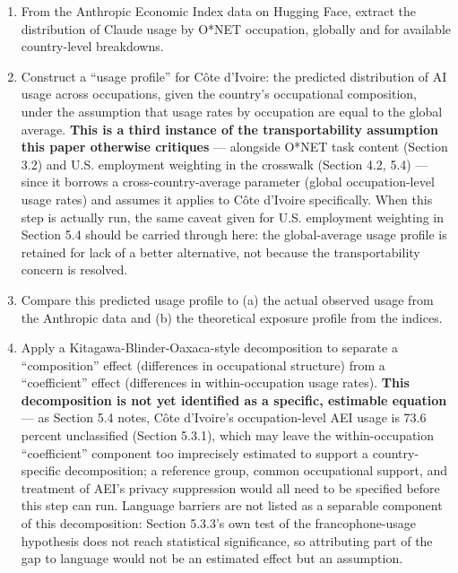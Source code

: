 \documentclass[
  11pt,
]{article}
\providecommand{\tightlist}{%
  \setlength{\itemsep}{0pt}\setlength{\parskip}{0pt}}
\begin{document}
\begin{enumerate}
\def\labelenumi{\arabic{enumi}.}
\tightlist
\item
  From the Anthropic Economic Index data on Hugging Face, extract the
  distribution of Claude usage by O*NET occupation, globally and for
  available country-level breakdowns.
\item
  Construct a ``usage profile'' for Côte d'Ivoire: the predicted
  distribution of AI usage across occupations, given the country's
  occupational composition, under the assumption that usage rates by
  occupation are equal to the global average. \textbf{This is a third
  instance of the transportability assumption this paper otherwise
  critiques} --- alongside O*NET task content (Section 3.2) and U.S.
  employment weighting in the crosswalk (Section 4.2, 5.4) --- since it
  borrows a cross-country-average parameter (global occupation-level
  usage rates) and assumes it applies to Côte d'Ivoire specifically.
  When this step is actually run, the same caveat given for U.S.
  employment weighting in Section 5.4 should be carried through here:
  the global-average usage profile is retained for lack of a better
  alternative, not because the transportability concern is resolved.
\item
  Compare this predicted usage profile to (a) the actual observed usage
  from the Anthropic data and (b) the theoretical exposure profile from
  the indices.
\item
  Apply a Kitagawa-Blinder-Oaxaca-style decomposition to separate a
  ``composition'' effect (differences in occupational structure) from a
  ``coefficient'' effect (differences in within-occupation usage rates).
  \textbf{This decomposition is not yet identified as a specific,
  estimable equation} --- as Section 5.4 notes, Côte d'Ivoire's
  occupation-level AEI usage is 73.6 percent unclassified (Section
  5.3.1), which may leave the within-occupation ``coefficient''
  component too imprecisely estimated to support a country-specific
  decomposition; a reference group, common occupational support, and
  treatment of AEI's privacy suppression would all need to be specified
  before this step can run. Language barriers are not listed as a
  separable component of this decomposition: Section 5.3.3's own test of
  the francophone-usage hypothesis does not reach statistical
  significance, so attributing part of the gap to language would not be
  an estimated effect but an assumption.
\end{enumerate}
\end{document}
